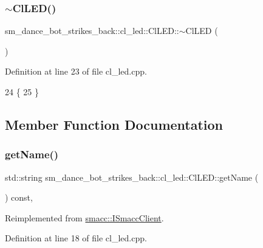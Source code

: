 \subsubsection{\texorpdfstring{$\sim$\+Cl\+L\+E\+D()}{~ClLED()}}
{\footnotesize\ttfamily sm\+\_\+dance\+\_\+bot\+\_\+strikes\+\_\+back\+::cl\+\_\+led\+::\+Cl\+L\+E\+D\+::$\sim$\+Cl\+L\+ED (\begin{DoxyParamCaption}{ }\end{DoxyParamCaption})\hspace{0.3cm}{\ttfamily [virtual]}}



Definition at line 23 of file cl\+\_\+led.\+cpp.


\begin{DoxyCode}
24 \{
25 \}
\end{DoxyCode}


\subsection{Member Function Documentation}
\mbox{\label{classsm__dance__bot__strikes__back_1_1cl__led_1_1ClLED_aa774d43fe5a936b4bf292cb5447becd9}} 
\subsubsection{\texorpdfstring{get\+Name()}{getName()}}
{\footnotesize\ttfamily std\+::string sm\+\_\+dance\+\_\+bot\+\_\+strikes\+\_\+back\+::cl\+\_\+led\+::\+Cl\+L\+E\+D\+::get\+Name (\begin{DoxyParamCaption}{ }\end{DoxyParamCaption}) const\hspace{0.3cm}{\ttfamily [override]}, {\ttfamily [virtual]}}



Reimplemented from \hyperlink{classsmacc_1_1ISmaccClient_a8c3ce19f182e71909c5dc6263d25be69}{smacc\+::\+I\+Smacc\+Client}.



Definition at line 18 of file cl\+\_\+led.\+cpp.



